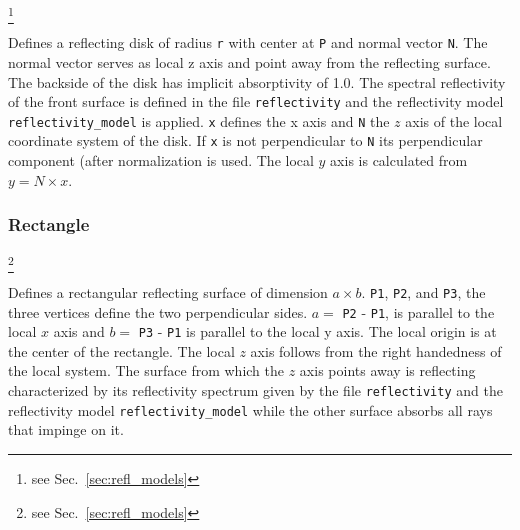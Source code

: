 \documentclass[10pt,a4paper,titlepage]{article}
\begin{document}





\footnote{see Sec.~\ref{sec:refl_models}}

\vspace{0.25cm}
Defines a reflecting disk of radius {\tt r} with center at {\tt P} and normal vector {\tt N}. The normal vector serves as local z axis and point away from the reflecting surface. The backside of the disk has implicit absorptivity of 1.0. The spectral reflectivity of the front surface is defined in the file {\tt reflectivity} and the reflectivity model {\tt reflectivity\_model} is applied. {\tt x} defines the x axis and {\tt N} the $z$ axis of the local coordinate system of the disk. If {\tt x} is not perpendicular to {\tt N} its perpendicular component (after normalization is used. The local $y$ axis is calculated from $y = N \times x$.

\subsubsection{Rectangle}







\footnote{see Sec.~\ref{sec:refl_models}}

\vspace{0.25cm}
Defines a rectangular reflecting surface of dimension $a \times b$. {\tt P1}, {\tt P2}, and {\tt P3}, the three vertices define the two perpendicular sides. $a=$ {\tt P2} - {\tt P1}, is parallel to the local $x$ axis and $b=$ {\tt P3} - {\tt P1} is parallel to the local y axis. The local origin is at the center of the rectangle. The local $z$ axis follows from the right handedness of the local system. The surface from which the $z$ axis points away is reflecting characterized by its reflectivity spectrum given by the file {\tt reflectivity} and the reflectivity model {\tt reflectivity\_model} while the other surface absorbs all rays that impinge on it.
\end{document}
